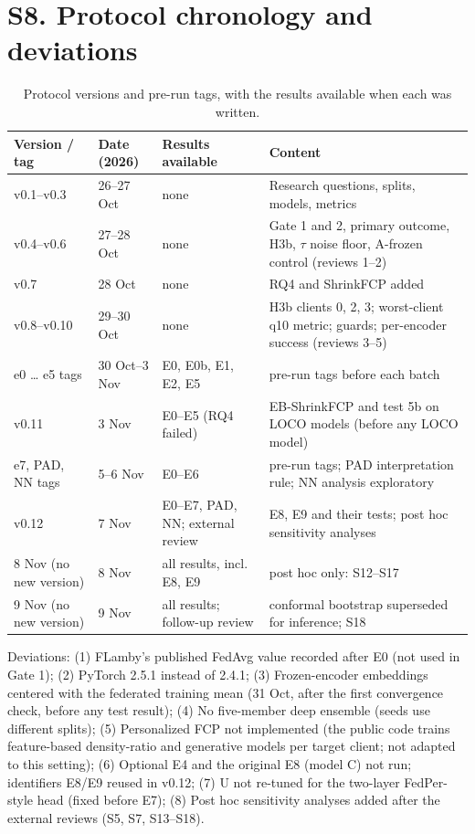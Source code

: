 \documentclass[10pt]{article}
\begin{document}
\section*{S8. Protocol chronology and deviations}
\begin{table}[!htbp]
\centering
\scriptsize
\caption{Protocol versions and pre-run tags, with the results available when each was written.}
\label{tab:s9}
\begin{tabular}{@{}llp{3.6cm}p{6.2cm}@{}}
\toprule
Version / tag & Date (2026) & Results available & Content \\
\midrule
v0.1--v0.3 & 26--27 Oct & none & Research questions, splits, models, metrics \\
v0.4--v0.6 & 27--28 Oct & none & Gate 1 and 2, primary outcome, H3b, $\tau$ noise floor, A-frozen control (reviews 1--2) \\
v0.7 & 28 Oct & none & RQ4 and ShrinkFCP added \\
v0.8--v0.10 & 29--30 Oct & none & H3b clients 0, 2, 3; worst-client q10 metric; guards; per-encoder success (reviews 3--5) \\
e0 \ldots{} e5 tags & 30 Oct--3 Nov & E0, E0b, E1, E2, E5 & pre-run tags before each batch \\
v0.11 & 3 Nov & E0--E5 (RQ4 failed) & EB-ShrinkFCP and test 5b on LOCO models (before any LOCO model) \\
e7, PAD, NN tags & 5--6 Nov & E0--E6 & pre-run tags; PAD interpretation rule; NN analysis exploratory \\
v0.12 & 7 Nov & E0--E7, PAD, NN; external review & E8, E9 and their tests; post hoc sensitivity analyses \\
8 Nov (no new version) & 8 Nov & all results, incl. E8, E9 & post hoc only: S12--S17 \\
9 Nov (no new version) & 9 Nov & all results; follow-up review & conformal bootstrap superseded for inference; S18 \\
\bottomrule
\end{tabular}
\end{table}
Deviations: (1) FLamby's published FedAvg value recorded after E0 (not used in Gate 1); (2) PyTorch 2.5.1 instead of 2.4.1; (3) Frozen-encoder embeddings centered with the federated training mean (31 Oct, after the first convergence check, before any test result); (4) No five-member deep ensemble (seeds use different splits); (5) Personalized FCP not implemented (the public code trains feature-based density-ratio and generative models per target client; not adapted to this setting); (6) Optional E4 and the original E8 (model C) not run; identifiers E8/E9 reused in v0.12; (7) U not re-tuned for the two-layer FedPer-style head (fixed before E7); (8) Post hoc sensitivity analyses added after the external reviews (S5, S7, S13--S18).
\end{document}
